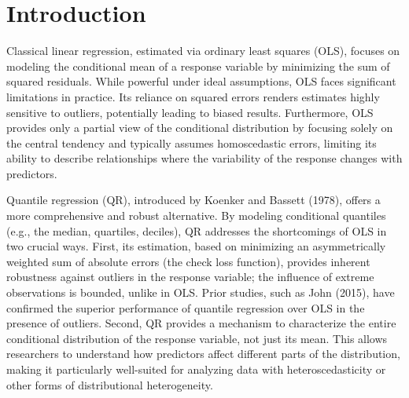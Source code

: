 \documentclass[fleqn,10pt]{latex/stylish_article} %
\affiliation{

}
\affiliation{*\textbf{}: } %
\begin{document}

\flushbottom %

\maketitle %

\tableofcontents %

\thispagestyle{empty} %


\section{Introduction}\label{introduction}

Classical linear regression, estimated via ordinary least squares (OLS), focuses on modeling the conditional mean of a response variable by minimizing the sum of squared residuals. While powerful under ideal assumptions, OLS faces significant limitations in practice. Its reliance on squared errors renders estimates highly sensitive to outliers, potentially leading to biased results. Furthermore, OLS provides only a partial view of the conditional distribution by focusing solely on the central tendency and typically assumes homoscedastic errors, limiting its ability to describe relationships where the variability of the response changes with predictors.

Quantile regression (QR), introduced by Koenker and Bassett (1978), offers a more comprehensive and robust alternative. By modeling conditional quantiles (e.g., the median, quartiles, deciles), QR addresses the shortcomings of OLS in two crucial ways. First, its estimation, based on minimizing an asymmetrically weighted sum of absolute errors (the check loss function), provides inherent robustness against outliers in the response variable; the influence of extreme observations is bounded, unlike in OLS. Prior studies, such as John (2015), have confirmed the superior performance of quantile regression over OLS in the presence of outliers. Second, QR provides a mechanism to characterize the entire conditional distribution of the response variable, not just its mean. This allows researchers to understand how predictors affect different parts of the distribution, making it particularly well-suited for analyzing data with heteroscedasticity or other forms of distributional heterogeneity.
\end{document}
